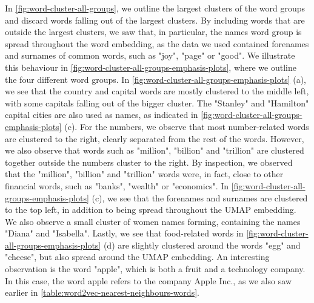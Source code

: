 In \cref{fig:word-cluster-all-groups}, we outline the largest clusters of the word groups and discard words falling out of the largest clusters. By including words that are outside the largest clusters, we saw that, in particular, the names word group is spread throughout the word embedding, as the data we used contained forenames and surnames of common words, such as "joy", "page" or "good". We illustrate this behaviour in \cref{fig:word-cluster-all-groups-emphasis-plots}, where we outline the four different word groups. In \cref{fig:word-cluster-all-groups-emphasis-plots} (a), we see that the country and capital words are mostly clustered to the middle left, with some capitals falling out of the bigger cluster. The "Stanley" and "Hamilton" capital cities are also used as names, as indicated in \cref{fig:word-cluster-all-groups-emphasis-plots} (c). For the numbers, we observe that most number-related words are clustered to the right, clearly separated from the rest of the words. However, we also observe that words such as "million", "billion" and "trillion" are clustered together outside the numbers cluster to the right. By inspection, we observed that the "million", "billion" and "trillion" words were, in fact, close to other financial words, such as "banks", "wealth" or "economics". In \cref{fig:word-cluster-all-groups-emphasis-plots} (c), we see that the forenames and surnames are clustered to the top left, in addition to being spread throughout the UMAP embedding. We also observe a small cluster of women names forming, containing the names "Diana" and "Isabella". Lastly, we see that food-related words in \cref{fig:word-cluster-all-groups-emphasis-plots} (d) are slightly clustered around the words "egg" and "cheese", but also spread around the UMAP embedding. An interesting observation is the word "apple", which is both a fruit and a technology company. In this case, the word apple refers to the company Apple Inc., as we also saw earlier in \cref{table:word2vec-nearest-neighbours-words}.
